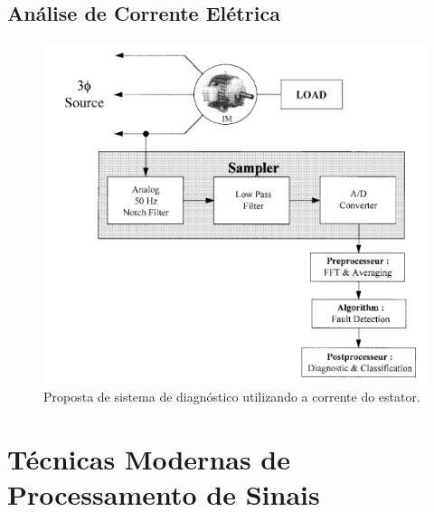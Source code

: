 % 

\subsection{Análise de Corrente Elétrica }\label{sec:}


\begin{figure}[H]
    \caption{Proposta de sistema de diagnóstico utilizando a corrente do estator.}
    \begin{center}
        \includegraphics[scale=.5]{referencial/img/current_benbouzid_p3.png}
    \end{center}
    \label{fig:}
\end{figure}

% 

\section{Técnicas Modernas de Processamento de Sinais}\label{sec:}



% 


